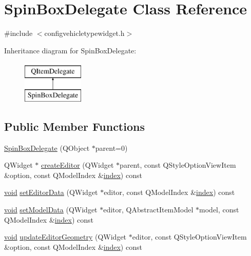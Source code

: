 \hypertarget{class_spin_box_delegate}{\section{Spin\-Box\-Delegate Class Reference}
\label{class_spin_box_delegate}
}


{\ttfamily \#include $<$configvehicletypewidget.\-h$>$}

Inheritance diagram for Spin\-Box\-Delegate\-:\begin{figure}[H]
\begin{center}
\leavevmode
\includegraphics[height=2.000000cm]{class_spin_box_delegate}
\end{center}
\end{figure}
\subsection*{Public Member Functions}
\begin{DoxyCompactItemize}
\item 
\hyperlink{group___config_plugin_gabf1b830266511d0237c97b46f49e01f9}{Spin\-Box\-Delegate} (Q\-Object $\ast$parent=0)
\item 
Q\-Widget $\ast$ \hyperlink{group___config_plugin_ga4fc1b4a209668b60b0834bdb1d36e1c0}{create\-Editor} (Q\-Widget $\ast$parent, const Q\-Style\-Option\-View\-Item \&option, const Q\-Model\-Index \&\hyperlink{glext_8h_ab47dd9958bcadea08866b42bf358e95e}{index}) const 
\item 
\hyperlink{group___u_a_v_objects_plugin_ga444cf2ff3f0ecbe028adce838d373f5c}{void} \hyperlink{group___config_plugin_gacbac1fc1091ef04b08ca9683a1d6f0ee}{set\-Editor\-Data} (Q\-Widget $\ast$editor, const Q\-Model\-Index \&\hyperlink{glext_8h_ab47dd9958bcadea08866b42bf358e95e}{index}) const 
\item 
\hyperlink{group___u_a_v_objects_plugin_ga444cf2ff3f0ecbe028adce838d373f5c}{void} \hyperlink{group___config_plugin_ga3698304b3741f548b0b4755c1782d291}{set\-Model\-Data} (Q\-Widget $\ast$editor, Q\-Abstract\-Item\-Model $\ast$model, const Q\-Model\-Index \&\hyperlink{glext_8h_ab47dd9958bcadea08866b42bf358e95e}{index}) const 
\item 
\hyperlink{group___u_a_v_objects_plugin_ga444cf2ff3f0ecbe028adce838d373f5c}{void} \hyperlink{group___config_plugin_ga3a90cff710ddd79a11b31054f9c963fb}{update\-Editor\-Geometry} (Q\-Widget $\ast$editor, const Q\-Style\-Option\-View\-Item \&option, const Q\-Model\-Index \&\hyperlink{glext_8h_ab47dd9958bcadea08866b42bf358e95e}{index}) const 
\end{DoxyCompactItemize}


